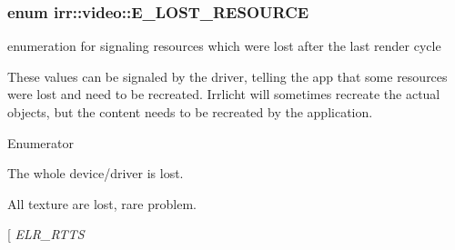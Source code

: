 \subsubsection[{\texorpdfstring{E\+\_\+\+L\+O\+S\+T\+\_\+\+R\+E\+S\+O\+U\+R\+CE}{E\_LOST\_RESOURCE}}]{\setlength{\rightskip}{0pt plus 5cm}enum {\bf irr\+::video\+::\+E\+\_\+\+L\+O\+S\+T\+\_\+\+R\+E\+S\+O\+U\+R\+CE}}\hypertarget{namespaceirr_1_1video_a5b423450f4c1775bfdc86b5998c3db72}{}\label{namespaceirr_1_1video_a5b423450f4c1775bfdc86b5998c3db72}


enumeration for signaling resources which were lost after the last render cycle 

These values can be signaled by the driver, telling the app that some resources were lost and need to be recreated. Irrlicht will sometimes recreate the actual objects, but the content needs to be recreated by the application. \begin{Desc}
\item[Enumerator]\par
\begin{description}
\item[{\em 
E\+L\+R\+\_\+\+D\+E\+V\+I\+CE\hypertarget{namespaceirr_1_1video_a5b423450f4c1775bfdc86b5998c3db72adac2eae358f00a2b6b8d5da56bc6d150}{}\label{namespaceirr_1_1video_a5b423450f4c1775bfdc86b5998c3db72adac2eae358f00a2b6b8d5da56bc6d150}
}]The whole device/driver is lost. \item[{\em 
E\+L\+R\+\_\+\+T\+E\+X\+T\+U\+R\+ES\hypertarget{namespaceirr_1_1video_a5b423450f4c1775bfdc86b5998c3db72a23b58f43419e5a990655f0ee331497a7}{}\label{namespaceirr_1_1video_a5b423450f4c1775bfdc86b5998c3db72a23b58f43419e5a990655f0ee331497a7}
}]All texture are lost, rare problem. \item[{\em 
E\+L\+R\+\_\+\+R\+T\+TS\hypertarget{namespaceirr_1_1video_a5b423450f4c1775bfdc86b5998c3db72aeb70fa0500307facb6ebfd368aaa1f5e}{}\label{namespaceirr_1_1video_a5b423450f4c1775bfdc86b5998c3db72aeb70fa0500307facb6ebfd368aaa1f5e}
}
\end{description}
\end{Desc}
